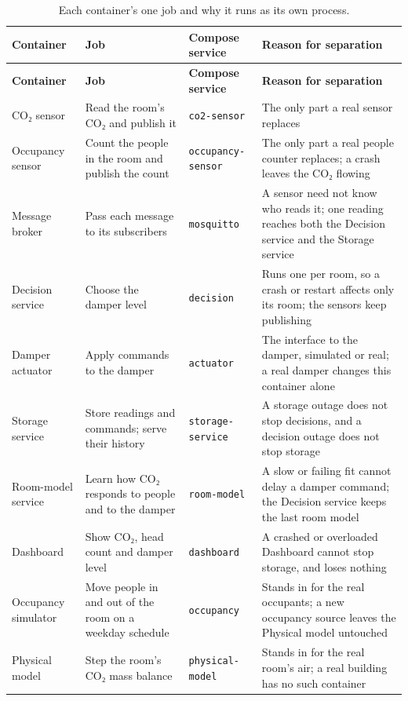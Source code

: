 \documentclass[11pt]{article}
\begin{document}
\begin{longtable}[]{@{}
  >{\raggedright\arraybackslash}p{}
  >{\raggedright\arraybackslash}p{}
  >{\raggedright\arraybackslash}p{}
  >{\raggedright\arraybackslash}p{}@{}}
\caption{Each container's one job and why it runs as its own
process.}\label{tab:responsibilities}\\
\toprule
\textbf{Container} & \textbf{Job} & \textbf{Compose service}
& \textbf{Reason for separation} \\
\midrule
\endfirsthead
\toprule
\textbf{Container} & \textbf{Job} & \textbf{Compose service}
& \textbf{Reason for separation} \\
\midrule
\endhead
CO₂ sensor & Read the room's CO₂ and publish it & \texttt{co2-sensor}
& The only part a real sensor replaces \\
\midrule
Occupancy sensor & Count the people in the room and publish the count
& \texttt{occupancy-sensor} & The only part a real people counter
replaces; a crash leaves the CO₂ flowing \\
\midrule
Message broker & Pass each message to its subscribers & \texttt{mosquitto}
& A sensor need not know who reads it; one reading reaches both the
Decision service and the Storage service \\
\midrule
Decision service & Choose the damper level & \texttt{decision}
& Runs one per room, so a crash or restart affects only its room; the
sensors keep publishing \\
\midrule
Damper actuator & Apply commands to the damper & \texttt{actuator}
& The interface to the damper, simulated or real; a real damper changes
this container alone \\
\midrule
Storage service & Store readings and commands; serve their history
& \texttt{storage-service} & A storage outage does not stop decisions,
and a decision outage does not stop storage \\
\midrule
Room-model service & Learn how CO₂ responds to people and to the damper
& \texttt{room-model} & A slow or failing fit cannot delay a damper
command; the Decision service keeps the last room model \\
\midrule
Dashboard & Show CO₂, head count and damper level
& \texttt{dashboard} & A crashed or overloaded Dashboard cannot stop
storage, and loses nothing \\
\midrule
Occupancy simulator & Move people in and out of the room on a weekday
schedule & \texttt{occupancy} & Stands in for the real occupants; a new
occupancy source leaves the Physical model untouched \\
\midrule
Physical model & Step the room's CO₂ mass balance & \texttt{physical-model}
& Stands in for the real room's air; a real building has no such
container \\
\bottomrule
\end{longtable}
\end{document}
